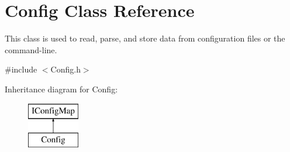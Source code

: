 \hypertarget{classConfig}{}\section{Config Class Reference}
\label{classConfig}


This class is used to read, parse, and store data from configuration files or the command-\/line.  




{\ttfamily \#include $<$Config.\+h$>$}

Inheritance diagram for Config\+:\begin{figure}[H]
\begin{center}
\leavevmode
\includegraphics[height=2.000000cm]{classConfig}
\end{center}
\end{figure}
